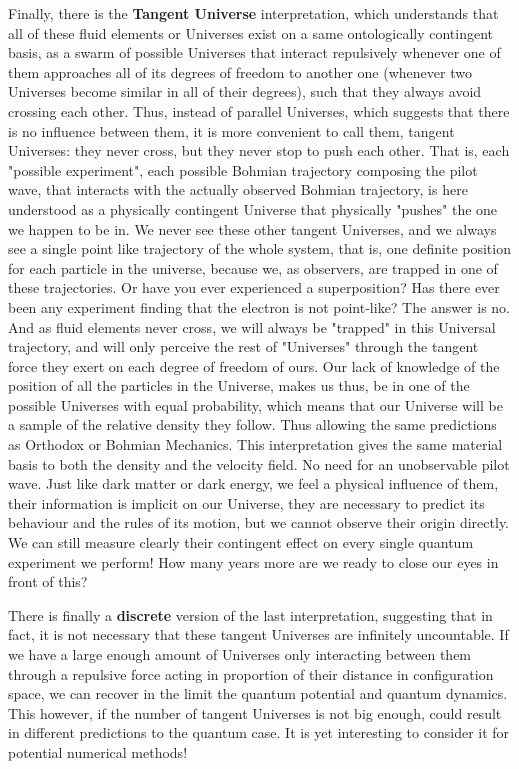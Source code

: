\documentclass[11pt, a4paper]{article} %
\begin{document}
Finally, there is the {\bf Tangent Universe} interpretation, which understands that all of these fluid elements or Universes exist on a same ontologically contingent basis, as a swarm of possible Universes that interact repulsively whenever one of them approaches all of its degrees of freedom to another one (whenever two Universes become similar in all of their degrees), such that they always avoid crossing each other. Thus, instead of parallel Universes, which suggests that there is no influence between them, it is more convenient to call them, tangent Universes: they never cross, but they never stop to push each other. That is, each "possible experiment", each possible Bohmian trajectory composing the pilot wave, that interacts with the actually observed Bohmian trajectory, is here understood as a physically contingent Universe that physically "pushes" the one we happen to be in. We never see these other tangent Universes, and we always see a single point like trajectory of the whole system, that is, one definite position for each particle in the universe, because we, as observers, are trapped in one of these trajectories. Or have you ever experienced a superposition? Has there ever been any experiment finding that the electron is not point-like? The answer is no. And as fluid elements never cross, we will always be "trapped" in this Universal trajectory, and will only perceive the rest of "Universes" through the tangent force they exert on each degree of freedom of ours. Our lack of knowledge of the position of all the particles in the Universe, makes us thus, be in one of the possible Universes with equal probability, which means that our Universe will be a sample of the relative density they follow. Thus allowing the same predictions as Orthodox or Bohmian Mechanics. This interpretation gives the same material basis to both the density and the velocity field. No need for an unobservable pilot wave. Just like dark matter or dark energy, we feel a physical influence of them, their information is implicit on our Universe, they are necessary to predict its behaviour and the rules of its motion, but we cannot observe their origin directly. We can still measure clearly their contingent effect on every single quantum experiment we perform! How many years more are we ready to close our eyes in front of this?

There is finally a {\bf discrete} version of the last interpretation, suggesting that in fact, it is not necessary that these tangent Universes are infinitely uncountable. If we have a large enough amount of Universes only interacting between them through a repulsive force acting in proportion of their distance in configuration space, we can recover in the limit the quantum potential and quantum dynamics. This however, if the number of tangent Universes is not big enough, could result in different predictions to the quantum case. It is yet interesting to consider it for potential numerical methods!\vspace{-0.3cm}
\end{document}
